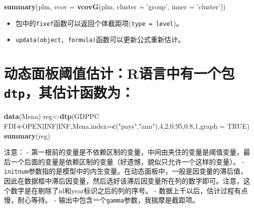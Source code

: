\documentclass[
]{book}
\newenvironment{Shaded}{\begin{snugshade}}{\end{snugshade}}
\newcommand{\DataTypeTok}[1]{\textcolor[rgb]{0.13,0.29,0.53}{#1}}
\newcommand{\DecValTok}[1]{\textcolor[rgb]{0.00,0.00,0.81}{#1}}
\newcommand{\FloatTok}[1]{\textcolor[rgb]{0.00,0.00,0.81}{#1}}
\newcommand{\KeywordTok}[1]{\textcolor[rgb]{0.13,0.29,0.53}{\textbf{#1}}}
\newcommand{\NormalTok}[1]{#1}
\newcommand{\OperatorTok}[1]{\textcolor[rgb]{0.81,0.36,0.00}{\textbf{#1}}}
\newcommand{\OtherTok}[1]{\textcolor[rgb]{0.56,0.35,0.01}{#1}}
\newcommand{\StringTok}[1]{\textcolor[rgb]{0.31,0.60,0.02}{#1}}
\providecommand{\tightlist}{%
  \setlength{\itemsep}{0pt}\setlength{\parskip}{0pt}}
\begin{document}
\begin{Shaded}
\begin{Highlighting}[]
\KeywordTok{summary}\NormalTok{(plm, }\DataTypeTok{vcov =} \KeywordTok{vcovG}\NormalTok{(plm, }\DataTypeTok{cluster =} \StringTok{'group'}\NormalTok{, }\DataTypeTok{inner =} \StringTok{'cluster'}\NormalTok{))}
\end{Highlighting}
\end{Shaded}

\begin{itemize}
\tightlist
\item
  包中的\texttt{fixef}函数可以返回个体截距项(\texttt{type\ =\ level})。
\item
  \texttt{updata(object,\ formula)}函数可以更新公式重新估计。
\end{itemize}

\hypertarget{ux52a8ux6001ux9762ux677fux9608ux503cux4f30ux8ba1rux8bedux8a00ux4e2dux6709ux4e00ux4e2aux5305dtpux5176ux4f30ux8ba1ux51fdux6570ux4e3a}{%
\section{\texorpdfstring{动态面板阈值估计：R语言中有一个包\texttt{dtp}，其估计函数为：}{动态面板阈值估计：R语言中有一个包dtp，其估计函数为：}}\label{ux52a8ux6001ux9762ux677fux9608ux503cux4f30ux8ba1rux8bedux8a00ux4e2dux6709ux4e00ux4e2aux5305dtpux5176ux4f30ux8ba1ux51fdux6570ux4e3a}}

\begin{Shaded}
\begin{Highlighting}[]
\KeywordTok{data}\NormalTok{(Mena)}
\NormalTok{reg<-}\KeywordTok{dtp}\NormalTok{(GDPPC }\OperatorTok{~}\StringTok{ }\NormalTok{FDI}\OperatorTok{+}\NormalTok{OPEN}\OperatorTok{|}\NormalTok{INF}\OperatorTok{|}\NormalTok{INF,Mena,}\DataTypeTok{index=}\KeywordTok{c}\NormalTok{(}\StringTok{"pays"}\NormalTok{,}\StringTok{"ann"}\NormalTok{),}\DecValTok{4}\NormalTok{,}\DecValTok{2}\NormalTok{,}\FloatTok{0.95}\NormalTok{,}\FloatTok{0.8}\NormalTok{,}\DecValTok{1}\NormalTok{,}\DataTypeTok{graph =} \OtherTok{TRUE}\NormalTok{)}
\KeywordTok{summary}\NormalTok{(reg)}
\end{Highlighting}
\end{Shaded}

注意：
- 第一根\texttt{\textbar{}}前的变量是不依赖区制的变量，中间由\texttt{\textbar{}}夹住的变量是阈值变量，最后一个\texttt{\textbar{}}后面的变量是依赖区制的变量（好遗憾，貌似只允许一个这样的变量）。
- \texttt{initnum}参数指的是模型中的内生变量。在动态面板中，一般是因变量的滞后值，因此在数据框中滞后因变量，然后选好该滞后因变量所在列的数字即可。注意，这个数字是在剔除了id和year标识之后的列的序号。
- 数据上千以后，估计过程有点慢，耐心等待。
- 输出中包含一个\texttt{gamma}参数，我揣摩是截距项。
\end{document}
